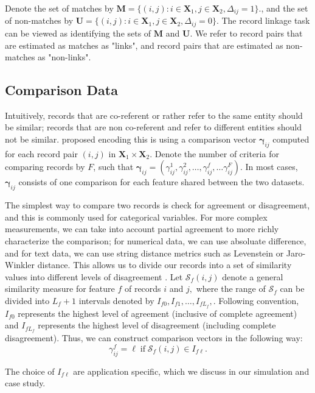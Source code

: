 \documentclass[12pt,letterpaper]{article}
\newcommand{\1}[1]{\mathbb{I}\!\left[#1\right]} %
\begin{document}
{Denote the set of matches by $\bm{M} = \{(i,j): i \in \bm{X}_1, j \in \bm{X}_2, \Delta_{ij} = 1\}.$, and the set of non-matches by 
$\bm{U} =  \{(i,j): i \in \bm{X}_1, j \in \bm{X}_2, \Delta_{ij} = 0\}.$ The record linkage task can be viewed as identifying the sets of  $\bm{M}$ and  $\bm{U}.$ We refer to record pairs that are estimated as matches as "links", and record pairs that are estimated as non-matches as "non-links".

\subsection{Comparison Data}

Intuitively, records that are co-referent or rather refer to the same entity should be similar; records that are non co-referent and refer to different entities should not be similar. \cite{fellegi_theory_1969} proposed encoding this is using a comparison vector $\bm{\gamma}_{ij}$ computed for each record pair $(i,j)$ in $\bm{X}_1 \times \bm{X}_2.$ Denote the number of criteria for comparing records by $F$, such that 
$\bm{\gamma}_{ij} = (\gamma_{ij}^1, \gamma_{ij}^2, \ldots, \gamma_{ij}^f, \ldots \gamma_{ij}^F).$ In most cases, $\bm{\gamma}_{ij}$ consists of one comparison for each feature shared between the two datasets. 

The simplest way to compare two records is check for agreement or disagreement, and this is commonly used for categorical variables. For more complex measurements, we can take into account partial agreement to more richly characterize the comparison; for numerical data, we can use absoluate difference, and for text data, we can use string distance metrics such as Levenstein or Jaro-Winkler distance. This allows us to divide our records into a set of similarity values into different levels of disagreement \citep{bilenko2006riddle, elmagarmid_duplicate_2007}. Let $\mathcal{S}_f(i,j)$ denote a general similarity measure for feature $f$ of records $i$ and $j,$ where the range of $\mathcal{S}_f$ can be divided into $L_f +1$ intervals denoted by $I_{f0}, I_{f1}, \ldots, I_{fL_f},$. Following convention, $I_{f0}$ represents the highest level of agreement (inclusive of complete agreement) and $I_{fL_f}$ represents the highest level of disagreement (including complete disagreement). Thus, we can construct comparison vectors in the following way: 
$$\gamma_{ij}^f = \ell \; \text{if} \; \mathcal{S}_f(i,j) \in I_{f\ell}.$$

The choice of $I_{f\ell}$ are application specific, which we discuss in our simulation and case study. 

}
\end{document}
